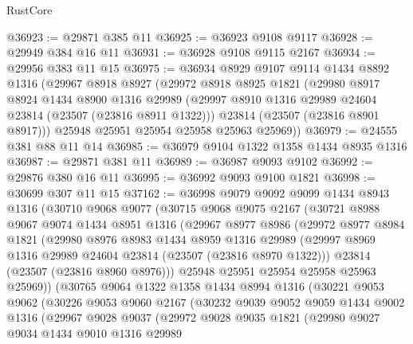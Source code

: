 \begin{lexlean}{RustCore}
\begin{coremodule}
@36923 := @29871 @385 @11
@36925 := @36923 @9108 @9117
@36928 := @29949 @384 @16 @11
@36931 := @36928 @9108 @9115 @2167
@36934 := @29956 @383 @11 @15
@36975 := @36934
    @8929
    @9107
    @9114
    @1434
    @8892
    @1316
    (@29967
      @8918
      @8927
      (@29972
        @8918
        @8925
        @1821
        (@29980
          @8917
          @8924
          @1434
          @8900
          @1316
          @29989
          (@29997 @8910 @1316 @29989 @24604 @23814 (@23507 (@23816 @8911 @1322)))
          @23814
          (@23507 (@23816 @8901 @8917)))
        @25948
        @25951
        @25954
        @25958
        @25963
        @25969))
@36979 := @24555 @381 @88 @11 @14
@36985 := @36979 @9104 @1322 @1358 @1434 @8935 @1316
@36987 := @29871 @381 @11
@36989 := @36987 @9093 @9102
@36992 := @29876 @380 @16 @11
@36995 := @36992 @9093 @9100 @1821
@36998 := @30699 @307 @11 @15
@37162 := @36998
    @9079
    @9092
    @9099
    @1434
    @8943
    @1316
    (@30710
      @9068
      @9077
      (@30715
        @9068
        @9075
        @2167
        (@30721
          @8988
          @9067
          @9074
          @1434
          @8951
          @1316
          (@29967
            @8977
            @8986
            (@29972
              @8977
              @8984
              @1821
              (@29980
                @8976
                @8983
                @1434
                @8959
                @1316
                @29989
                (@29997 @8969 @1316 @29989 @24604 @23814 (@23507 (@23816 @8970 @1322)))
                @23814
                (@23507 (@23816 @8960 @8976)))
              @25948
              @25951
              @25954
              @25958
              @25963
              @25969))
          (@30765
            @9064
            @1322
            @1358
            @1434
            @8994
            @1316
            (@30221
              @9053
              @9062
              (@30226
                @9053
                @9060
                @2167
                (@30232
                  @9039
                  @9052
                  @9059
                  @1434
                  @9002
                  @1316
                  (@29967
                    @9028
                    @9037
                    (@29972
                      @9028
                      @9035
                      @1821
                      (@29980
                        @9027
                        @9034
                        @1434
                        @9010
                        @1316
                        @29989

\end{coremodule}
\end{lexlean}
